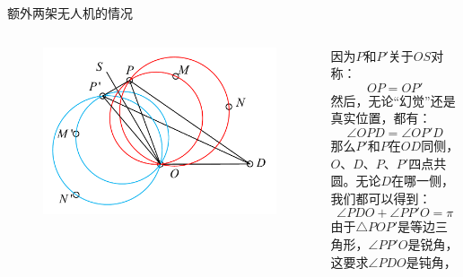 \documentclass[aspectratio=169]{beamer}
\begin{document}
\begin{frame}{额外两架无人机的情况}
    \begin{columns}
        \begin{figure}[!ht]
            \centering
            \includegraphics[width = \textwidth]{图片/两架无人机情况.pdf}
        \end{figure}

        因为$P$和$P'$关于$OS$对称：
        \begin{equation}
            OP = OP'
        \end{equation}
        然后，无论“幻觉”还是真实位置，都有：
        \begin{equation}
            \angle OPD = \angle OP'D
        \end{equation}
        那么$P'$和$P$在$OD$同侧，$O$、$D$、$P$、$P'$四点共圆。无论$D$在哪一侧，我们都可以得到：
        \begin{equation}
            \angle PDO + \angle PP'O = \pi
        \end{equation}
        由于$\bigtriangleup POP'$是等边三角形，$\angle PP'O$是锐角，这要求$\angle PDO$是钝角，
    \end{columns}
\end{frame}
\end{document}
